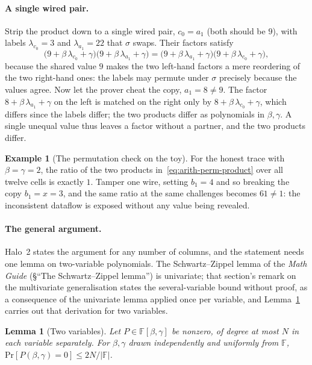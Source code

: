 \documentclass[11pt,a4paper]{article}
\newtheorem{lemma}[theorem]{Lemma}
\theoremstyle{definition}
\newtheorem{example}[theorem]{Example}
\newcommand{\F}{\mathbb{F}}
\renewcommand{\Pr}{\mathrm{Pr}}
\begin{document}
\paragraph{A single wired pair.}
Strip the product down to a single wired pair, $c_0 = a_1$ (both should
be $9$), with labels $\lambda_{c_0} = 3$ and $\lambda_{a_1} = 22$ that $\sigma$
swaps. Their factors satisfy
\[
\bigl(9 + \beta\,\lambda_{c_0} + \gamma\bigr)\bigl(9 + \beta\,\lambda_{a_1}
  + \gamma\bigr)
=
\bigl(9 + \beta\,\lambda_{a_1} + \gamma\bigr)\bigl(9 + \beta\,\lambda_{c_0}
  + \gamma\bigr),
\]
because the shared value $9$ makes the two left-hand factors a mere
reordering of the two right-hand ones: the labels may permute under
$\sigma$ precisely because the values agree. Now let the prover cheat the
copy, $a_1 = 8 \ne 9$. The factor $8 + \beta\,\lambda_{a_1} + \gamma$ on the
left is matched on the right only by $8 + \beta\,\lambda_{c_0} + \gamma$,
which differs since the labels differ; the two products differ as
polynomials in $\beta, \gamma$. A single unequal value thus leaves a
factor without a partner, and the two products differ.

\begin{example}[The permutation check on the toy]\label{ex:arith-perm-toy}
For the honest trace with $\beta = \gamma = 2$, the ratio of the two
products in~\eqref{eq:arith-perm-product} over all twelve cells is
exactly $1$. Tamper one wire, setting $b_1 = 4$ and so breaking the copy
$b_1 = x = 3$, and the same ratio at the same challenges becomes
$61 \ne 1$: the inconsistent dataflow is exposed without any value being
revealed.
\end{example}

\paragraph{The general argument.}
Halo~2 states the argument for any number of columns, and the statement
needs one lemma on two-variable polynomials. The Schwartz--Zippel lemma
of the \emph{Math Guide} (\S``The Schwartz--Zippel lemma'') is
univariate; that section's remark on the multivariate generalisation
states the several-variable bound without proof, as a consequence of the
univariate lemma applied once per variable, and
Lemma~\ref{lem:arith-bivariate} carries out that derivation for two
variables.

\begin{lemma}[Two variables]\label{lem:arith-bivariate}
Let $P \in \F[\beta, \gamma]$ be nonzero, of degree at most $N$ in each
variable separately. For $\beta, \gamma$ drawn independently and
uniformly from $\F$, $\Pr[P(\beta, \gamma) = 0] \le 2N / |\F|$.
\end{lemma}
\end{document}
